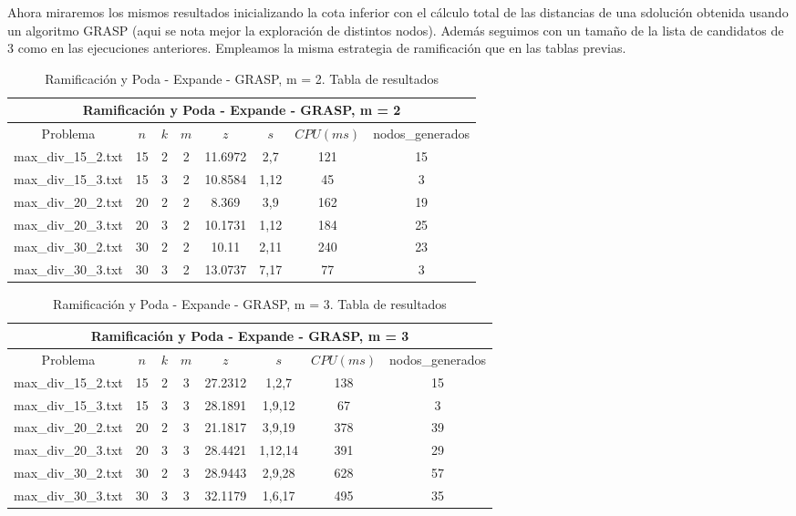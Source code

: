 \clearpage
Ahora miraremos los mismos resultados inicializando la cota inferior con el cálculo total de las distancias de una sdolución obtenida usando un algoritmo GRASP (aqui se nota mejor la exploración de distintos nodos). Además seguimos con un tamaño de la lista de candidatos de 3 como en las ejecuciones anteriores. Empleamos la misma estrategia de ramificación que en las tablas previas.

   \begin{table}[h]
   {\small
   \begin{center}
   \begin{tabular}{cccccccc}
      \multicolumn{8}{c}{Ramificación y Poda - Expande - GRASP, m = 2} \\
      \hline
      Problema & $n$ & $k$ & $m$ & $z$ & $s$ & $CPU(ms)$ & nodos\_generados \\
      \hline
      max\_div\_15\_2.txt & 15 & 2 & 2 & 11.6972 & 2,7 & 121 & 15 \\
      max\_div\_15\_3.txt & 15 & 3 & 2 & 10.8584 & 1,12 & 45 & 3 \\
      max\_div\_20\_2.txt & 20 & 2 & 2 & 8.369 & 3,9 & 162 & 19 \\
      max\_div\_20\_3.txt & 20 & 3 & 2 & 10.1731 & 1,12 & 184 & 25 \\
      max\_div\_30\_2.txt & 30 & 2 & 2 & 10.11 & 2,11 & 240 & 23 \\
      max\_div\_30\_3.txt & 30 & 3 & 2 & 13.0737 & 7,17 & 77 & 3 \\
      \hline
   \end{tabular}
   \end{center}
   }
   \caption{Ramificación y Poda - Expande - GRASP, m = 2. Tabla de resultados}
   \end{table}

   \begin{table}[h]
   {\small
   \begin{center}
   \begin{tabular}{cccccccc}
      \multicolumn{8}{c}{Ramificación y Poda - Expande - GRASP, m = 3} \\
      \hline
      Problema & $n$ & $k$ & $m$ & $z$ & $s$ & $CPU(ms)$ & nodos\_generados \\
      \hline
      max\_div\_15\_2.txt & 15 & 2 & 3 & 27.2312 & 1,2,7 & 138 & 15 \\
      max\_div\_15\_3.txt & 15 & 3 & 3 & 28.1891 & 1,9,12 & 67 & 3 \\
      max\_div\_20\_2.txt & 20 & 2 & 3 & 21.1817 & 3,9,19 & 378 & 39 \\
      max\_div\_20\_3.txt & 20 & 3 & 3 & 28.4421 & 1,12,14 & 391 & 29 \\
      max\_div\_30\_2.txt & 30 & 2 & 3 & 28.9443 & 2,9,28 & 628 & 57 \\
      max\_div\_30\_3.txt & 30 & 3 & 3 & 32.1179 & 1,6,17 & 495 & 35 \\
      \hline
   \end{tabular}
   \end{center}
   }
   \caption{Ramificación y Poda - Expande - GRASP, m = 3. Tabla de resultados}
   \end{table}

